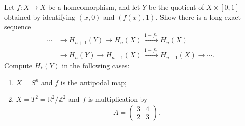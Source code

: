 \begin{problem}
Let \(f:X\to X\) be a homeomorphism, and let \(Y\) be the quotient of \(X\times [0,1]\) obtained by identifying \((x,0)\) and \((f(x),1)\). Show there is a long exact sequence
\[
\begin{aligned}
\cdots&\longrightarrow H_{n+1}(Y)\longrightarrow H_n(X)
\xrightarrow{\,1-f_*\,}H_n(X)\\
&\longrightarrow H_n(Y)\longrightarrow H_{n-1}(X)
\xrightarrow{\,1-f_*\,}H_{n-1}(X)\longrightarrow\cdots .
\end{aligned}
\]
Compute \(H_*(Y)\) in the following cases:
\begin{enumerate}
	\item \(X=S^n\) and \(f\) is the antipodal map;
	\item \(X=T^2=\mathbb R^2/\mathbb Z^2\) and \(f\) is multiplication by
	\[
	A=\begin{pmatrix}3&4\\2&3\end{pmatrix}.
	\]
\end{enumerate}

\par
\end{problem}

